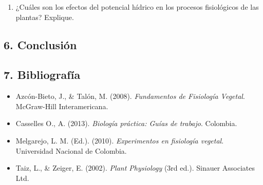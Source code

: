 \documentclass[
  spanish,
  10pt,
  letterpaper,
  twocolumn]{article}
\providecommand{\tightlist}{%
  \setlength{\itemsep}{0pt}\setlength{\parskip}{0pt}}
\begin{document}
\begin{enumerate}
\def\labelenumi{\arabic{enumi}.}
\setcounter{enumi}{3}
\tightlist
\item
  ¿Cuáles son los efectos del potencial hídrico en los procesos
  fisiológicos de las plantas? Explique.
\end{enumerate}

\hrulefill

\hrulefill

\hrulefill

\hrulefill

\hrulefill

\hrulefill

\hrulefill

\hrulefill

\hrulefill

\hrulefill

\subsection{6. Conclusión}\label{conclusiuxf3n}

\hrulefill

\hrulefill

\hrulefill

\hrulefill

\hrulefill

\hrulefill

\hrulefill

\subsection{7. Bibliografía}\label{bibliografuxeda}

\begin{itemize}
\item
  Azcón-Bieto, J., \& Talón, M. (2008). \emph{Fundamentos de Fisiología
  Vegetal}. McGraw-Hill Interamericana.
\item
  Casselles O., A. (2013). \emph{Biología práctica: Guías de trabajo}.
  Colombia.
\item
  Melgarejo, L. M. (Ed.). (2010). \emph{Experimentos en fisiología
  vegetal}. Universidad Nacional de Colombia.
\item
  Taiz, L., \& Zeiger, E. (2002). \emph{Plant Physiology} (3rd ed.).
  Sinauer Associates Ltd.
\end{itemize}
\end{document}
